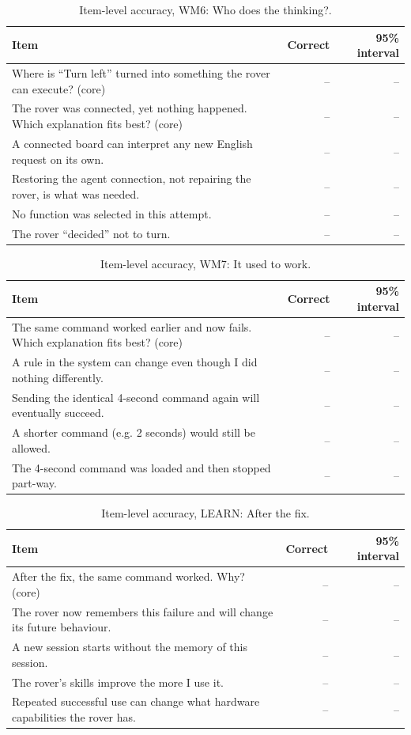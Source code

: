 \begin{table}[t]
\caption{Item-level accuracy, WM6: Who does the thinking?.}\label{tab:items-wm6}
\small
\begin{tabular}{p{7.2cm}rr}
\toprule
Item & Correct & 95\% interval\\
\midrule
Where is ``Turn left'' turned into something the rover can execute? (core) & -- & --\\
The rover was connected, yet nothing happened. Which explanation fits best? (core) & -- & --\\
A connected board can interpret any new English request on its own. & -- & --\\
Restoring the agent connection, not repairing the rover, is what was needed. & -- & --\\
No function was selected in this attempt. & -- & --\\
The rover ``decided'' not to turn. & -- & --\\
\bottomrule
\end{tabular}
\end{table}

\begin{table}[t]
\caption{Item-level accuracy, WM7: It used to work.}\label{tab:items-wm7}
\small
\begin{tabular}{p{7.2cm}rr}
\toprule
Item & Correct & 95\% interval\\
\midrule
The same command worked earlier and now fails. Which explanation fits best? (core) & -- & --\\
A rule in the system can change even though I did nothing differently. & -- & --\\
Sending the identical 4-second command again will eventually succeed. & -- & --\\
A shorter command (e.g. 2 seconds) would still be allowed. & -- & --\\
The 4-second command was loaded and then stopped part-way. & -- & --\\
\bottomrule
\end{tabular}
\end{table}

\begin{table}[t]
\caption{Item-level accuracy, LEARN: After the fix.}\label{tab:items-ls}
\small
\begin{tabular}{p{7.2cm}rr}
\toprule
Item & Correct & 95\% interval\\
\midrule
After the fix, the same command worked. Why? (core) & -- & --\\
The rover now remembers this failure and will change its future behaviour. & -- & --\\
A new session starts without the memory of this session. & -- & --\\
The rover's skills improve the more I use it. & -- & --\\
Repeated successful use can change what hardware capabilities the rover has. & -- & --\\
\bottomrule
\end{tabular}
\end{table}

